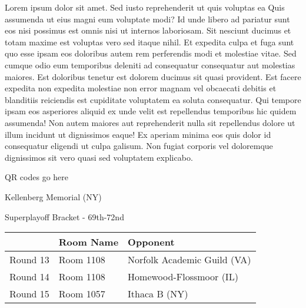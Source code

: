 \documentclass{article}%
\begin{document}
\vspace*{8pt}%
\linebreak%
\newline%
\newline%
Lorem ipsum dolor sit amet. Sed iusto reprehenderit ut quis voluptas ea Quis assumenda ut eius magni eum voluptate modi? Id unde libero ad pariatur sunt eos nisi possimus est omnis nisi ut internos laboriosam. Sit nesciunt ducimus et totam maxime est voluptas vero sed itaque nihil. Et expedita culpa et fuga sunt quo esse ipsam eos doloribus autem rem perferendis modi et molestiae vitae.\newline%
\newline%
Sed cumque odio eum temporibus deleniti ad consequatur consequatur aut molestias maiores. Est doloribus tenetur est dolorem ducimus sit quasi provident. Est facere expedita non expedita molestiae non error magnam vel obcaecati debitis et blanditiis reiciendis est cupiditate voluptatem ea soluta consequatur. Qui tempore ipsam eos asperiores aliquid ex unde velit est repellendus temporibus hic quidem assumenda!\newline%
\newline%
Non autem maiores aut reprehenderit nulla sit repellendus dolore ut illum incidunt ut dignissimos eaque! Ex aperiam minima eos quis dolor id consequatur eligendi ut culpa galisum. Non fugiat corporis vel doloremque dignissimos sit vero quasi sed voluptatem explicabo.\newline%
\newline%
%
\vspace*{30pt}%
\begin{center}%
\begin{Huge}%
QR codes go here%
\end{Huge}%
\end{center}%
\newpage%
\begin{center}%
\begin{Huge}%
Kellenberg Memorial (NY)%
\end{Huge}%
\vspace*{8pt}%
\linebreak%
\begin{Large}%
Superplayoff Bracket {-} 69th{-}72nd%
\end{Large}%
\end{center}%
%
\begin{tabularx}{\textwidth}{|c|Y|Y|}%
\hline%
&Room Name&Opponent\\%
\hline%
Round 13&Room 1108&Norfolk Academic Guild (VA)\\%
Round 14&Room 1108&Homewood{-}Flossmoor (IL)\\%
Round 15&Room 1057&Ithaca B (NY)\\%
\hline%
\end{tabularx}%
\end{document}
